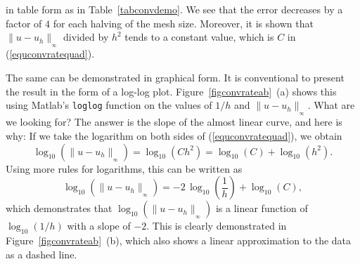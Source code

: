 \documentclass[12pt]{article}
\numberwithin{equation}{section}
\numberwithin{table}{section}
\numberwithin{figure}{section}
\newcommand{\norm}[2]{\|{#1}\|_{{}_{#2}}}
\begin{document}
in table form as in Table~\ref{tabconvdemo}. We see that the error
decreases by a factor of $4$ for each halving of the mesh size.
Moreover, it is shown that $\norm{u - u_h}{\infty}$ divided by $h^2$
tends to a constant value, which is $C$ in (\ref{equconvratequad}).

The same can be demonstrated in graphical form. It is conventional
to present the result in the form of a log-log plot.
Figure~\ref{figconvrateab}~(a) shows this using Matlab's \verb+loglog+
function on the values of $1 / h$ and $\norm{u - u_h}{\infty}$.
What are we looking for? The answer is the slope of the almost linear
curve, and here is why: If we take the logarithm on both sides of
(\ref{equconvratequad}), we obtain
\begin{displaymath}
  \log_{10}\left(\norm{u - u_h}{\infty}\right)
    = \log_{10}\left(C h^2\right)
    = \log_{10}\left(C\right) + \log_{10}\left(h^2\right).
\end{displaymath}
Using more rules for logarithms, this can be written as
\begin{equation} \label{equlinearity}
  \log_{10}\left(\norm{u - u_h}{\infty}\right) =
    -2 \, \log_{10}\left({\textstyle \frac{1}{h}}\right)
    + \log_{10}\left(C\right),
\end{equation}
which demonstrates that $\log_{10} (\norm{u - u_h}{\infty})$ is
a linear function of $\log_{10} (1/h)$ with a slope of $-2$.
This is clearly demonstrated in Figure~\ref{figconvrateab}~(b),
which also shows a linear approximation to the data as a dashed line.
\end{document}
